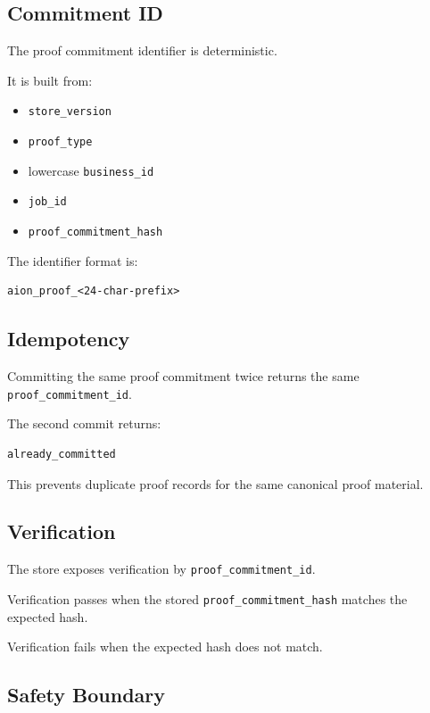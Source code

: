\subsection{Commitment ID}

The proof commitment identifier is deterministic.

It is built from:

\begin{itemize}
  \item \texttt{store\_version}
  \item \texttt{proof\_type}
  \item lowercase \texttt{business\_id}
  \item \texttt{job\_id}
  \item \texttt{proof\_commitment\_hash}
\end{itemize}

The identifier format is:

\begin{verbatim}
aion_proof_<24-char-prefix>
\end{verbatim}

\subsection{Idempotency}

Committing the same proof commitment twice returns the same \texttt{proof\_commitment\_id}.

The second commit returns:

\begin{verbatim}
already_committed
\end{verbatim}

This prevents duplicate proof records for the same canonical proof material.

\subsection{Verification}

The store exposes verification by \texttt{proof\_commitment\_id}.

Verification passes when the stored \texttt{proof\_commitment\_hash} matches the expected hash.

Verification fails when the expected hash does not match.

\subsection{Safety Boundary}

